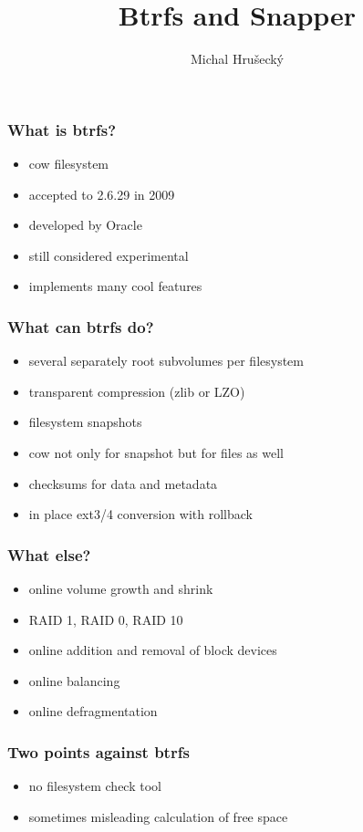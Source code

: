 \documentclass{beamer}
\author{Michal Hru\v{s}eck\'{y}\newline {\small openSUSE Boosters}}
\title{Btrfs and Snapper}
\begin{document}
\begin{frame}[t,plain]
\titlepage
\end{frame}


\begin{frame}[t]
\frametitle{What is btrfs?}
\begin{itemize}
	\item cow filesystem
	\item accepted to 2.6.29 in 2009
	\item developed by Oracle
	\item still considered experimental
	\item implements many cool features
\end{itemize}
\end{frame}

\begin{frame}[t]
\frametitle{What can btrfs do?}
\begin{itemize}
   \item several separately root subvolumes per filesystem
   \item transparent compression (zlib or LZO)
   \item filesystem snapshots
   \item cow not only for snapshot but for files as well
   \item checksums for data and metadata
   \item in place ext3/4 conversion with rollback
\end{itemize}
\end{frame}

\begin{frame}[t]
\frametitle{What else?}
\begin{itemize}
	\item online volume growth and shrink
   \item RAID 1, RAID 0, RAID 10
	\item online addition and removal of block devices
	\item online balancing
	\item online defragmentation
\end{itemize}
\end{frame}

\begin{frame}[t]
\frametitle{Two points against btrfs}
\begin{itemize}
	\item no filesystem check tool
	\item sometimes misleading calculation of free space
\end{itemize}
\end{frame}
\end{document}
